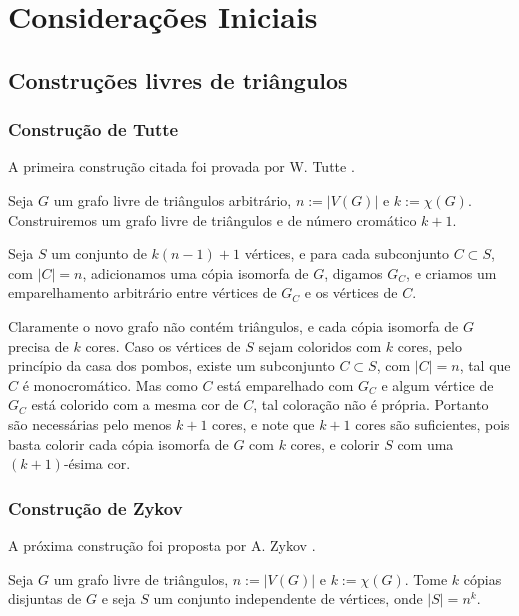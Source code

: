\chapter{Considerações Iniciais}
\label{cap:consiniciais}

\section{Construções livres de triângulos}


\subsection{Construção de Tutte}

A primeira construção citada foi provada por W. Tutte \cite{descartes1947three}.

Seja $G$ um grafo livre de triângulos arbitrário, $n := |V(G)|$ e $k := \chi(G)$. Construiremos um grafo livre de triângulos e de número cromático $k+1$.

Seja $S$ um conjunto de $k(n-1)+1$ vértices, e para cada subconjunto $C \subset S$, com $|C| = n$, adicionamos uma cópia isomorfa de $G$, digamos $G_C$, e criamos um emparelhamento arbitrário entre vértices de $G_C$ e os vértices de $C$.

Claramente o novo grafo não contém triângulos, e cada cópia isomorfa de $G$ precisa de $k$ cores. Caso os vértices de $S$ sejam coloridos com $k$ cores, pelo princípio da casa dos pombos, existe um subconjunto $C \subset S$, com $|C| = n$, tal que $C$ é monocromático. Mas como $C$ está emparelhado com $G_C$ e algum vértice de $G_C$ está colorido com a mesma cor de $C$, tal coloração não é própria. Portanto são necessárias pelo menos $k+1$ cores, e note que $k+1$ cores são suficientes, pois basta colorir cada cópia isomorfa de $G$ com $k$ cores, e colorir $S$ com uma $(k+1)$-ésima cor.

\subsection{Construção de Zykov}

A próxima construção foi proposta por A. Zykov \cite{zykov1949some}.

Seja $G$ um grafo livre de triângulos, $n:=|V(G)|$ e $k:= \chi(G)$. Tome $k$ cópias disjuntas de $G$ e seja $S$ um conjunto independente de vértices, onde $|S| = n^k$.

